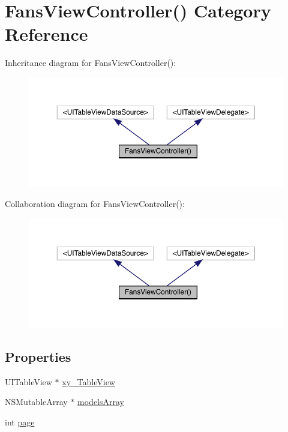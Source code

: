 \hypertarget{category_fans_view_controller_07_08}{}\section{Fans\+View\+Controller() Category Reference}
\label{category_fans_view_controller_07_08}


Inheritance diagram for Fans\+View\+Controller()\+:\nopagebreak
\begin{figure}[H]
\begin{center}
\leavevmode
\includegraphics[width=350pt]{category_fans_view_controller_07_08__inherit__graph}
\end{center}
\end{figure}


Collaboration diagram for Fans\+View\+Controller()\+:\nopagebreak
\begin{figure}[H]
\begin{center}
\leavevmode
\includegraphics[width=350pt]{category_fans_view_controller_07_08__coll__graph}
\end{center}
\end{figure}
\subsection*{Properties}
\begin{DoxyCompactItemize}
\item 
U\+I\+Table\+View $\ast$ \mbox{\hyperlink{category_fans_view_controller_07_08_ae13dde547026d0de163f6faab5bfb41c}{xy\+\_\+\+Table\+View}}
\item 
N\+S\+Mutable\+Array $\ast$ \mbox{\hyperlink{category_fans_view_controller_07_08_a2fc958b9203f7187c50e1f0f6de7caad}{models\+Array}}
\item 
int \mbox{\hyperlink{category_fans_view_controller_07_08_ab5bd7a04722881fac3a0ebe70f2e2f32}{page}}
\end{DoxyCompactItemize}


